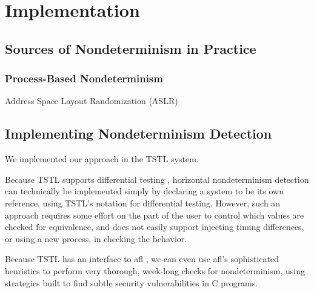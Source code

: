 \section{Implementation}

\subsection{Sources of Nondeterminism in Practice}

\subsubsection{Process-Based Nondeterminism}

Address Space Layout Randomization (ASLR) \cite{ASLR} 

\subsection{Implementing Nondeterminism Detection}

We implemented our approach in the TSTL \cite{NFM15} system.

Because TSTL supports differential testing \cite{tstlsttt}, horizontal
nondeterminism detection can technically be implemented simply by
declaring a system to be its own reference, using TSTL's notation for
differential testing.  However, such an approach requires some effort
on the part of the user to control which values are checked for
equivalence, and does not easily support injecting timing differences,
or using a new process, in checking the behavior.



Because TSTL has an interface to afl \cite{aflfuzz}, we can even use
afl's sophisticated heuristics to perform very thorough, week-long
checks for nondeterminism, using strategies built to find subtle
security vulnerabilities in C programs.